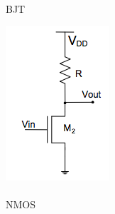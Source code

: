 \documentclass[pdftex,12pt,a4paper]{report}
\begin{document}
\begin{figure}[!htb]
  \caption{\\BJT}\label{fig:fig_bjt}
\endminipage\hfill
{}
  \includegraphics[width=\linewidth]{Imagens/NMOS.png}
  \caption{\\NMOS}\label{fig:fig_nmos}
\endminipage
{}

\end{figure}
\end{document}
